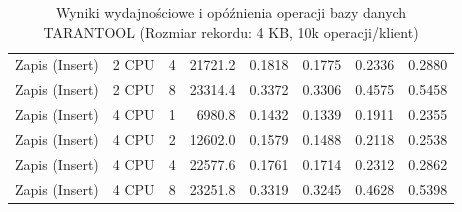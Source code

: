 \begin{table}[ht]
{\begin{tabular}{llcrrrrr}
Zapis (Insert) & 2 CPU & 4 & 21721.2 & 0.1818 & 0.1775 & 0.2336 & 0.2880 \\
Zapis (Insert) & 2 CPU & 8 & 23314.4 & 0.3372 & 0.3306 & 0.4575 & 0.5458 \\
Zapis (Insert) & 4 CPU & 1 & 6980.8 & 0.1432 & 0.1339 & 0.1911 & 0.2355 \\
Zapis (Insert) & 4 CPU & 2 & 12602.0 & 0.1579 & 0.1488 & 0.2118 & 0.2538 \\
Zapis (Insert) & 4 CPU & 4 & 22577.6 & 0.1761 & 0.1714 & 0.2312 & 0.2862 \\
Zapis (Insert) & 4 CPU & 8 & 23251.8 & 0.3319 & 0.3245 & 0.4628 & 0.5398 \\
\bottomrule
\end{tabular}%
}
\caption{Wyniki wydajnościowe i opóźnienia operacji bazy danych TARANTOOL (Rozmiar rekordu: 4 KB, 10k operacji/klient)}
\label{tab:latency_tarantool_medium_10000}
\end{table}
